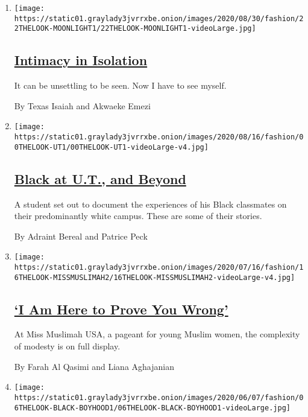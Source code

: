 \begin{enumerate}
\def\labelenumi{\arabic{enumi}.}
\item
  \texttt{[image: https://static01.graylady3jvrrxbe.onion/images/2020/08/30/fashion/22THELOOK-MOONLIGHT1/22THELOOK-MOONLIGHT1-videoLarge.jpg]}

  \hypertarget{intimacy-in-isolation}{%
  \subsection{\texorpdfstring{\href{/2020/08/29/style/intimacy-in-isolation.html}{Intimacy
  in Isolation}}{Intimacy in Isolation}}\label{intimacy-in-isolation}}

  It can be unsettling to be seen. Now I have to see myself.

  By Texas Isaiah and Akwaeke Emezi
\item
  \texttt{[image: https://static01.graylady3jvrrxbe.onion/images/2020/08/16/fashion/00THELOOK-UT1/00THELOOK-UT1-videoLarge-v4.jpg]}

  \hypertarget{black-at-ut-and-beyond}{%
  \subsection{\texorpdfstring{\href{/2020/08/08/style/black-yearbook-university-texas-austin.html}{Black
  at U.T., and
  Beyond}}{Black at U.T., and Beyond}}\label{black-at-ut-and-beyond}}

  A student set out to document the experiences of his Black classmates
  on their predominantly white campus. These are some of their stories.

  By Adraint Bereal and Patrice Peck
\item
  \texttt{[image: https://static01.graylady3jvrrxbe.onion/images/2020/07/16/fashion/16THELOOK-MISSMUSLIMAH2/16THELOOK-MISSMUSLIMAH2-videoLarge-v4.jpg]}

  \hypertarget{i-am-here-to-prove-you-wrong}{%
  \subsection{\texorpdfstring{\href{/2020/07/04/style/muslim-beauty-pageant-miss-muslimah-usa.html}{`I
  Am Here to Prove You
  Wrong'}}{`I Am Here to Prove You Wrong'}}\label{i-am-here-to-prove-you-wrong}}

  At Miss Muslimah USA, a pageant for young Muslim women, the complexity
  of modesty is on full display.

  By Farah Al Qasimi and Liana Aghajanian
\item
  \texttt{[image: https://static01.graylady3jvrrxbe.onion/images/2020/06/07/fashion/06THELOOK-BLACK-BOYHOOD1/06THELOOK-BLACK-BOYHOOD1-videoLarge.jpg]}


\end{enumerate}
